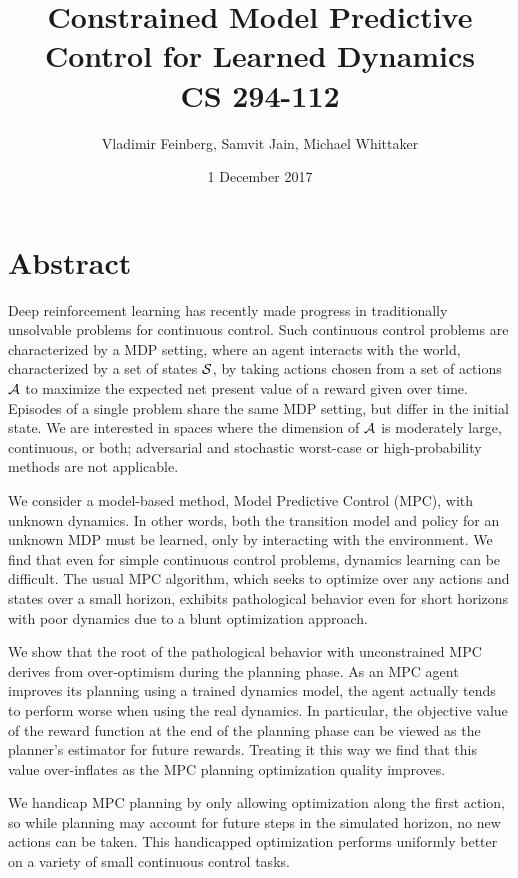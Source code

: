 \documentclass{article}
\title{Constrained Model Predictive Control for Learned Dynamics\\\large CS 294-112}
\author{Vladimir Feinberg, Samvit Jain, Michael Whittaker}
\date{1 December 2017}
\begin{document}
\maketitle

\section{Abstract}

Deep reinforcement learning has recently made progress in traditionally unsolvable problems for continuous control. Such continuous control problems are characterized by a MDP setting, where an agent interacts with the world, characterized by a set of states $\mathcal{S}$, by taking actions chosen from a set of actions $\mathcal{A}$ to maximize the expected net present value of a reward given over time. Episodes of a single problem share the same MDP setting, but differ in the initial state. We are interested in spaces where the dimension of $\mathcal{A}$ is moderately large, continuous, or both; adversarial and stochastic worst-case or high-probability methods are not applicable.

We consider a model-based method, Model Predictive Control (MPC), with unknown dynamics. In other words, both the transition model and policy for an unknown MDP must be learned, only by interacting with the environment. We find that even for simple continuous control problems, dynamics learning can be difficult. The usual MPC algorithm, which seeks to optimize over any actions and states over a small horizon, exhibits pathological behavior even for short horizons with poor dynamics due to a blunt optimization approach.

We show that the root of the pathological behavior with unconstrained MPC derives from over-optimism during the planning phase. As an MPC agent improves its planning using a trained dynamics model, the agent actually tends to perform worse when using the real dynamics. In particular, the objective value of the reward function at the end of the planning phase can be viewed as the planner's estimator for future rewards. Treating it this way we find that this value over-inflates as the MPC planning optimization quality improves.

We handicap MPC planning by only allowing optimization along the first action, so while planning may account for future steps in the simulated horizon, no new actions can be taken. This handicapped optimization performs uniformly better on a variety of small continuous control tasks.
\end{document}
